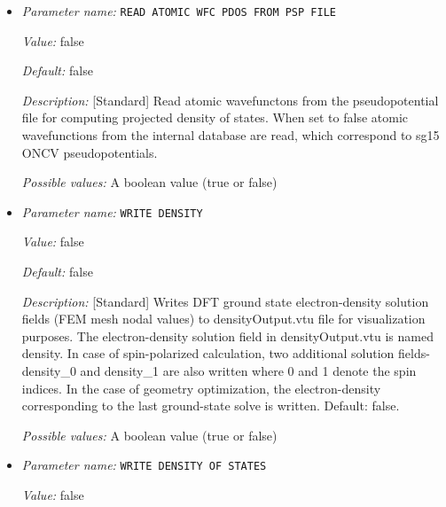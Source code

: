 \begin{itemize}
\item {\it Parameter name:} {\tt READ ATOMIC WFC PDOS FROM PSP FILE}
\label{parameters:Ground_2dstate derived computations/READ ATOMIC WFC PDOS FROM PSP FILE}
\label{parameters:Ground_2dstate_20derived_20computations/READ_20ATOMIC_20WFC_20PDOS_20FROM_20PSP_20FILE}


{\it Value:} false


{\it Default:} false


{\it Description:} [Standard] Read atomic wavefunctons from the pseudopotential file for computing projected density of states. When set to false atomic wavefunctions from the internal database are read, which correspond to sg15 ONCV pseudopotentials.


{\it Possible values:} A boolean value (true or false)
\item {\it Parameter name:} {\tt WRITE DENSITY}
\label{parameters:Ground_2dstate derived computations/WRITE DENSITY}
\label{parameters:Ground_2dstate_20derived_20computations/WRITE_20DENSITY}


{\it Value:} false


{\it Default:} false


{\it Description:} [Standard] Writes DFT ground state electron-density solution fields (FEM mesh nodal values) to densityOutput.vtu file for visualization purposes. The electron-density solution field in densityOutput.vtu is named density. In case of spin-polarized calculation, two additional solution fields- density\_0 and density\_1 are also written where 0 and 1 denote the spin indices. In the case of geometry optimization, the electron-density corresponding to the last ground-state solve is written. Default: false.


{\it Possible values:} A boolean value (true or false)
\item {\it Parameter name:} {\tt WRITE DENSITY OF STATES}
\label{parameters:Ground_2dstate derived computations/WRITE DENSITY OF STATES}
\label{parameters:Ground_2dstate_20derived_20computations/WRITE_20DENSITY_20OF_20STATES}


{\it Value:} false



\end{itemize}
